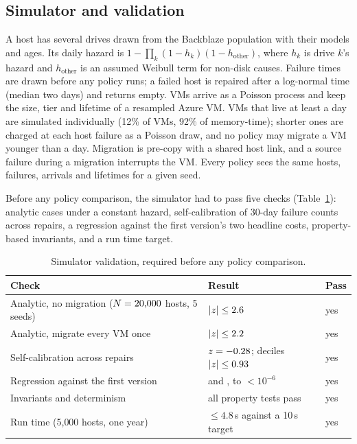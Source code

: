 \documentclass[pdflatex,sn-mathphys-num,iicol]{sn-jnl}
\theoremstyle{thmstyleone}%
\theoremstyle{thmstylethree}%
\begin{document}
\subsection{Simulator and validation}\label{sec:sim}

A host has several drives drawn from the Backblaze population with their models and ages. Its
daily hazard is $1 - \prod_k (1-h_k)(1-h_{\mathrm{other}})$, where $h_k$ is drive $k$'s hazard and
$h_{\mathrm{other}}$ is an assumed Weibull term for non-disk causes. Failure times are drawn before
any policy runs; a failed host is repaired after a log-normal time (median two days) and returns
empty. VMs arrive as a Poisson process and keep the size, tier and lifetime of a resampled Azure
VM. VMs that live at least a day are simulated individually (12\% of VMs, 92\% of memory-time);
shorter ones are charged at each host failure as a Poisson draw, and no policy may migrate a VM
younger than a day. Migration is pre-copy with a shared host link, and a source failure during a
migration interrupts the VM. Every policy sees the same hosts, failures, arrivals and lifetimes
for a given seed.

Before any policy comparison, the simulator had to pass five checks (Table~\ref{tab:g2}): analytic
cases under a constant hazard, self-calibration of 30-day failure counts across repairs, a
regression against the first version's two headline costs, property-based invariants, and a run
time target.

\begin{table}[!t]\centering
\caption{Simulator validation, required before any policy comparison.}\label{tab:g2}
\setlength{\tabcolsep}{4pt}\footnotesize
\begin{tabular}{lll}\toprule
Check & Result & Pass \\ \midrule
Analytic, no migration ($N = 20{,}000$ hosts, 5 seeds) & $|z| \le 2.6$ & yes \\
Analytic, migrate every VM once & $|z| \le 2.2$ & yes \\
Self-calibration across repairs & $z = -0.28$; deciles $|z| \le 0.93$ & yes \\
Regression against the first version & \VVOneCostCS{} and \VVOneCostMatched{}, to $<10^{-6}$ & yes \\
Invariants and determinism & all property tests pass & yes \\
Run time (5{,}000 hosts, one year) & $\le 4.8$\,s against a 10\,s target & yes \\
\bottomrule\end{tabular}
\end{table}
\end{document}
